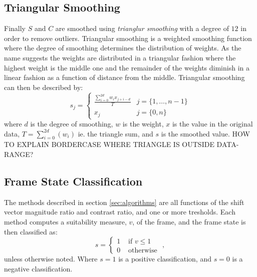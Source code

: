 \subsection{Triangular Smoothing}
%
%
%
%
%
Finally $S$ and $C$ are smoothed using \textit{trianglur smoothing} with a degree of $12$ in order to remove outliers. Triangular smoothing is a weighted smoothing function where the degree of smoothing determines the distribution of weights. As the name suggests the weights are distributed in a triangular fashion where the highest weight is the middle one and the remainder of the weights diminish in a linear fashion as a function of distance from the middle. Triangular smoothing can then be described by:
%
\[
s_{j} = 
\begin{cases}
\frac{\sum_{i=0}^{2d} w_{i}x_{j+i-d}}{T} & j=\{1,\dots,n-1\}\\
x_{j} & j=\{0,n\}
\end{cases}
\]
%
where $d$ is the degree of smoothing, $w$ is the weight, $x$ is the value in the original data, $T = \sum_{i=0}^{2d}(w_{i})$ ie. the triangle sum, and $s$ is the smoothed value. HOW TO EXPLAIN BORDERCASE WHERE TRIANGLE IS OUTSIDE DATA-RANGE? %
%
\subsection{Frame State Classification}
%
The methods described in section \ref{sec:algorithms} are all functions of the shift vector magnitude ratio and contrast ratio, and one or more tresholds. Each method computes a suitability measure, $v$, of the frame, and the frame state is then classified as:
\[
s = 
\begin{cases}
1 & \text{ if } v \leq 1\\
0 & \text{ otherwise }
\end{cases},
\]
unless otherwise noted. Where $s=1$ is a positive classification, and $s=0$ is a negative classification.
